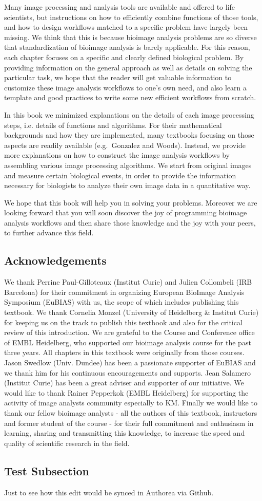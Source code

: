 Many image processing and analysis tools are available and offered to
life scientists, but instructions on how to efficiently combine functions of those tools, 
and how to design workflows matched to a specific problem have largely been missing. 
We think that this is because bioimage analysis problems are so diverse that
standardization of bioimage analysis is barely applicable. For this
reason, each chapter focuses on a specific and clearly defined biological
problem. By providing information on the general approach as well as details on solving the particular task, we hope that the reader will get valuable information to customize these image analysis workflows to one's own need, and also learn a template and good practices to  write some new efficient workflows from scratch.

In this book we minimized explanations on the details of each
image processing steps, i.e. details of functions and algorithms. For their mathematical backgrounds and how they
are implemented, many textbooks focusing on those aspects are readily available (e.g.~Gonzalez and Woods). Instead, we provide more explanations on how to construct the image analysis workflows by
assembling various image processing algorithms. We start from original
images and measure certain biological events, in order to provide the 
information necessary for biologists to analyze their own image data in a quantitative way.

We hope that this book will help you in solving your problems. Moreover we are looking forward that you will soon discover the joy of programming bioimage analysis workflows and then share those knowledge and the joy with your peers, to further advance this field.

\subsection{Acknowledgements}\label{acknowledgements}

We thank Perrine Paul-Gilloteaux (Institut Curie) and Julien Collombeli (IRB Barcelona) for their commitment in organizing European BioImage Analysis Symposium (EuBIAS) with us, the scope of which includes publishing this textbook. We thank Cornelia Monzel (University of Heidelberg \& Institut Curie) for keeping us on the track to publish this textbook and also for the critical review of this introduction. We are grateful to the Course and Conference office of EMBL Heidelberg, who supported our bioimage analysis course for the past three years. All chapters in this textbook were originally from those courses. Jason Swedlow (Univ. Dundee) has been a passionate supporter of EuBIAS and we thank him for his continuous encouragements and supports. Jean Salamero (Institut Curie) has been a great adviser and supporter of our initiative. We would like to thank Rainer Pepperkok (EMBL Heidelberg) for supporting the activity of image analysts community especially to KM.  Finally we would like to thank our fellow bioimage analysts - all the authors of this textbook, instructors and former student of the course - for their full commitment and enthusiasm in learning, sharing and  transmitting this knowledge, to increase the speed and quality of scientific research in the field.

\subsection{Test Subsection}

Just to see how this edit would be synced in Authorea via Github. 
